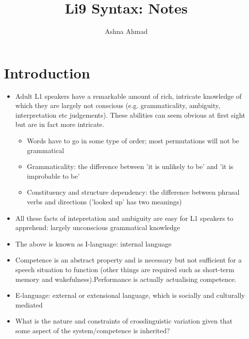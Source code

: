\documentclass{article}
\title{Li9 Syntax: Notes}
\author{Ashna Ahmad}
\begin{document}
\maketitle

\tableofcontents

\section{Introduction}
\begin{itemize}

    \item Adult L1 speakers have a remarkable amount of rich, intricate knowledge of which they are largely not conscious (e.g. grammaticality, ambiguity, interpretation etc judgements). These abilities can seem obvious at first sight but are in fact more intricate.
    \begin{itemize}
    \item  Words have to go in some type of order; most permutations will not be grammatical
    \item Grammaticality: the difference between 'it is unlikely to be' and 'it is improbable to be'
    \item Constituency and structure dependency: the difference between phrasal verbs and directions ('looked up' has two meanings)
    \end{itemize}
    \item All these facts of intepretation and ambiguity are easy for L1 speakers to apprehend: largely unconscious grammatical knowledge
    \item The above is known as I-language: internal language
    \item Competence is an abstract property and is necessary but not sufficient for a speech situation to function (other things are required such as short-term memory and wakefulness).Performance is actually actualising competence.
    \item E-language: external or extensional language, which is socially and culturally mediated
    \item What is the nature and constraints of crosslinguistic variation given that some aspect of the system/competence is inherited?

\end{itemize}
\end{document}
